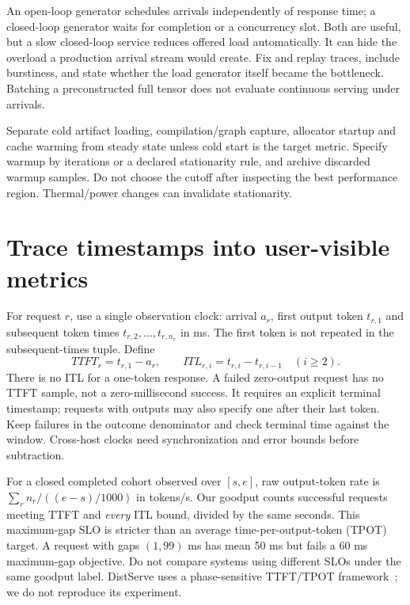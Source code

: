 An open-loop generator schedules arrivals independently of response time;
a closed-loop generator waits for completion or a concurrency slot. Both are
useful, but a slow closed-loop service reduces offered load automatically.
It can hide the overload a production arrival stream would create. Fix and
replay traces, include burstiness, and state whether the load generator itself
became the bottleneck. Batching a preconstructed full tensor does not evaluate
continuous serving under arrivals.

Separate cold artifact loading, compilation/graph capture, allocator startup
and cache warming from steady state unless cold start is the target metric.
Specify warmup by iterations or a declared stationarity rule, and archive
discarded warmup samples. Do not choose the cutoff after inspecting the best
performance region. Thermal/power changes can invalidate stationarity.

\section{Trace timestamps into user-visible metrics}
\label{evod47:metrics}
For request $r$, use a single observation clock: arrival $a_r$, first output
token $t_{r,1}$ and subsequent token times $t_{r,2},\ldots,t_{r,n_r}$ in ms.
The first token is not repeated in the subsequent-times tuple. Define
\[
 TTFT_r=t_{r,1}-a_r,\qquad
 ITL_{r,i}=t_{r,i}-t_{r,i-1}\quad(i\ge2).
\]
There is no ITL for a one-token response. A failed zero-output request has no
TTFT sample, not a zero-millisecond success. It requires an explicit terminal
timestamp; requests with outputs may also specify one after their last token.
Keep failures in the outcome denominator and check terminal time against the window.
Cross-host clocks need synchronization and error bounds before subtraction.


For a closed completed cohort observed over $[s,e]$, raw output-token rate is
$\sum_r n_r/((e-s)/1000)$ in tokens/s. Our goodput counts successful requests
meeting TTFT and \emph{every} ITL bound, divided by the same seconds.
This maximum-gap SLO is stricter than an average time-per-output-token
(TPOT) target. A request with gaps $(1,99)$ ms has mean 50 ms but fails a
60 ms maximum-gap objective. Do not compare systems using different SLOs
under the same goodput label. DistServe uses a phase-sensitive TTFT/TPOT
framework~\cite{distserve47}; we do not reproduce its experiment.

